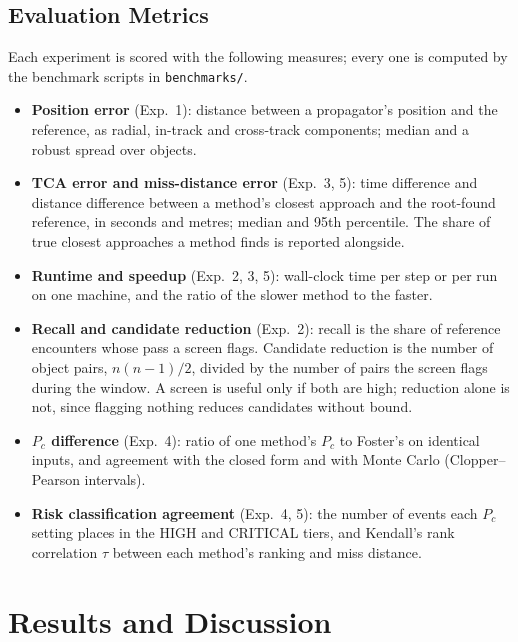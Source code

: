 \documentclass[conference]{IEEEtran}
\begin{document}
\subsection{Evaluation Metrics}
Each experiment is scored with the following measures; every one is computed by the benchmark scripts in \texttt{benchmarks/}.
\begin{itemize}
\item \textbf{Position error} (Exp.~1): distance between a propagator's position and the reference, as radial, in-track and cross-track components; median and a robust spread over objects.
\item \textbf{TCA error and miss-distance error} (Exp.~3, 5): time difference and distance difference between a method's closest approach and the root-found reference, in seconds and metres; median and 95th percentile. The share of true closest approaches a method finds is reported alongside.
\item \textbf{Runtime and speedup} (Exp.~2, 3, 5): wall-clock time per step or per run on one machine, and the ratio of the slower method to the faster.
\item \textbf{Recall and candidate reduction} (Exp.~2): recall is the share of reference encounters whose pass a screen flags. Candidate reduction is the number of object pairs, $n(n-1)/2$, divided by the number of pairs the screen flags during the window. A screen is useful only if both are high; reduction alone is not, since flagging nothing reduces candidates without bound.
\item \textbf{$P_c$ difference} (Exp.~4): ratio of one method's $P_c$ to Foster's on identical inputs, and agreement with the closed form and with Monte Carlo (Clopper--Pearson intervals).
\item \textbf{Risk classification agreement} (Exp.~4, 5): the number of events each $P_c$ setting places in the HIGH and CRITICAL tiers, and Kendall's rank correlation $\tau$ between each method's ranking and miss distance.
\end{itemize}

\section{Results and Discussion}
\end{document}
